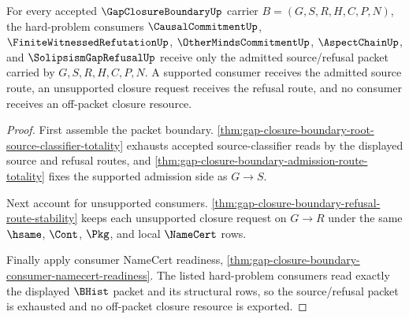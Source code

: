 \begin{theorem}
\label{thm:gap-closure-boundary-consumer-readiness-exhaustion}
For every accepted $\GapClosureBoundaryUp$ carrier $B=(G,S,R,H,C,P,N)$, the hard-problem consumers $\CausalCommitmentUp$, $\FiniteWitnessedRefutationUp$, $\OtherMindsCommitmentUp$, $\AspectChainUp$, and $\SolipsismGapRefusalUp$ receive only the admitted source/refusal packet carried by $G,S,R,H,C,P,N$. A supported consumer receives the admitted source route, an unsupported closure request receives the refusal route, and no consumer receives an off-packet closure resource.
\end{theorem}
\begin{proof}
First assemble the packet boundary. \autoref{thm:gap-closure-boundary-root-source-classifier-totality} exhausts accepted source-classifier reads by the displayed source and refusal routes, and \autoref{thm:gap-closure-boundary-admission-route-totality} fixes the supported admission side as $G \longrightarrow S$.

Next account for unsupported consumers. \autoref{thm:gap-closure-boundary-refusal-route-stability} keeps each unsupported closure request on $G \longrightarrow R$ under the same $\hsame$, $\Cont$, $\Pkg$, and local $\NameCert$ rows.

Finally apply consumer NameCert readiness, \autoref{thm:gap-closure-boundary-consumer-namecert-readiness}. The listed hard-problem consumers read exactly the displayed $\BHist$ packet and its structural rows, so the source/refusal packet is exhausted and no off-packet closure resource is exported.
\end{proof}
